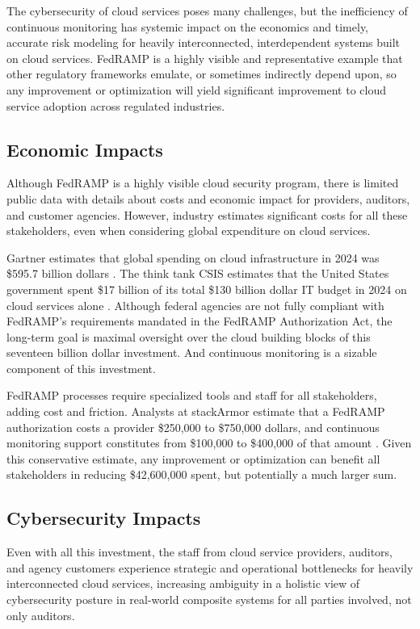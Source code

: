 \documentclass{jdf}
\begin{document}
The cybersecurity of cloud services poses many challenges, but the inefficiency of continuous monitoring has systemic impact on the economics and timely, accurate risk modeling for heavily interconnected, interdependent systems built on cloud services. FedRAMP is a highly visible and representative example that other regulatory frameworks emulate, or sometimes indirectly depend upon, so any improvement or optimization will yield significant improvement to cloud service adoption across regulated industries.

\subsection{Economic Impacts} \label{economics}

Although FedRAMP is a highly visible cloud security program, there is limited public data with details about costs and economic impact for providers, auditors, and customer agencies. However, industry estimates significant costs for all these stakeholders, even when considering global expenditure on cloud services.

Gartner estimates that global spending on cloud infrastructure in 2024 was \$595.7 billion dollars \citeyear{gartner24}. The think tank CSIS estimates that the United States government spent \$17 billion of its total \$130 billion dollar IT budget in 2024 on cloud services alone \citeyear[p.~1]{csis25}. Although federal agencies are not fully compliant with FedRAMP's requirements mandated in the FedRAMP Authorization Act, the long-term goal is maximal oversight over the cloud building blocks of this seventeen billion dollar investment. And continuous monitoring is a sizable component of this investment.

FedRAMP processes require specialized tools and staff for all stakeholders, adding cost and friction. Analysts at stackArmor estimate that a FedRAMP authorization costs a provider \$250,000 to \$750,000 dollars, and continuous monitoring support constitutes from \$100,000 to \$400,000 of that amount \citeyear{stackarmor24}. Given this conservative estimate, any improvement or optimization can benefit all stakeholders in reducing \$42,600,000 spent, but potentially a much larger sum.

\subsection{Cybersecurity Impacts}

Even with all this investment, the staff from cloud service providers, auditors, and agency customers experience strategic and operational bottlenecks for heavily interconnected cloud services, increasing ambiguity in a holistic view of cybersecurity posture in real-world composite systems for all parties involved, not only auditors. 
\end{document}
